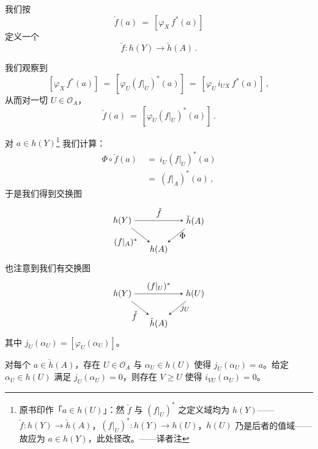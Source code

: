 我们按
\[\check{f}(a)\ =\ [\varphi_{X}\,f^{*}(a)]
\]
定义一个\trHomomorphism
\[\check{f}\colon h(Y)\longrightarrow\check{h}(A)\,.
\]

我们观察到
\[[\varphi_{X}\,f^{*}(a)]\ =\ [\varphi_{U}(f|_{U})^{*}(a)]\ =\ [\varphi_{U}\,i_{UX}\,f^{*}(a)]\,,
\]
从而对一切 $U\in\mathcal{O}_{A}$，
\[\check{f}(a)\ =\ [\varphi_{U}(f|_{U})^{*}(a)]\,.
\]

对 $a\in h(Y)$\footnote{原书印作「$a\in h(U)$」：然 $\check{f}$ 与 $(f|_{U})^{*}$ 之定义域均为 $h(Y)$——$\check{f}\colon h(Y)\to\check{h}(A)$，$(f|_{U})^{*}\colon h(Y)\to h(U)$，$h(U)$ 乃是后者的值域——故应为 $a\in h(Y)$，此处径改。——译者注} 我们计算：
\begin{align*}
\Phi\circ\check{f}(a)\ &=\ i_{U}(f|_{U})^{*}(a)\\
&=\ (f|_{A})^{*}(a)\,,
\end{align*}
于是我们得到交换图
\[
\begin{tikzpicture}[>=stealth, baseline=(hY.base)]
\node (hY) at (0,0) {$h(Y)$};
\node (hA) at (3,0) {$\check{h}(A)$};
\node (hB) at (1.5,-1.2) {$h(A)$};
\draw[->] (hY) -- node[above]{$\check{f}$} (hA);
\draw[->] (hA) -- node[right]{$\Phi$} (hB);
\draw[->] (hY) -- node[below left]{$(f|_{A})^{*}$} (hB);
\end{tikzpicture}
\]
也注意到我们有交换图
\[
\begin{tikzpicture}[>=stealth, baseline=(hY2.base)]
\node (hY2) at (0,0) {$h(Y)$};
\node (hU) at (3,0) {$h(U)$};
\node (hA2) at (1.5,-1.2) {$\check{h}(A)$};
\draw[->] (hY2) -- node[above]{$(f|_{U})^{*}$} (hU);
\draw[->] (hU) -- node[right]{$j_{U}$} (hA2);
\draw[->] (hY2) -- node[below left]{$\check{f}$} (hA2);
\end{tikzpicture}
\]
其中 $j_{U}(\alpha_{U})=[\varphi_{U}(\alpha_{U})]$。

\begin{proposition}\label{prop:a8-representative}
对每个 $a\in\check{h}(A)$，存在 $U\in\mathcal{O}_{A}$ 与 $\alpha_{U}\in h(U)$
使得 $j_{U}(\alpha_{U})=a$。给定 $\alpha_{U}\in h(U)$ 满足
$j_{U}(\alpha_{U})=0$，则存在 $V\geq U$ 使得 $i_{VU}(\alpha_{U})=0$。
\end{proposition}


